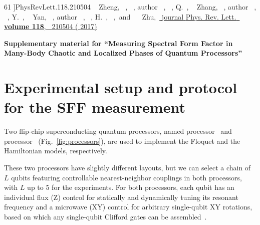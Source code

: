 \documentclass[aps,prx,reprint,twocolumn,superscriptaddress,floatfix,nofootinbib]{revtex4-2}
\newcommand{\beginsupplement}{
    \setcounter{table}{0}
    \renewcommand{\thetable}{S\arabic{table}}
    \setcounter{figure}{0}
    \renewcommand{\thefigure}{S\arabic{figure}}
    \setcounter{equation}{0}
    \renewcommand{\theequation}{S\arabic{equation}}
    \setcounter{section}{0}
    \renewcommand{\thesection}{S\arabic{section}}
    \setcounter{page}{1}
   }
\begin{document}
\begin{thebibliography}{61}
{  }]{PhysRevLett.118.210504}
  \BibitemOpen
   { {~\bibnamefont
  {Zheng}},  {~},
   {\ }, \bibinfo
  {author} {~}, 
  {~},  {\bibfnamefont
  {Q.}~},  {~\bibnamefont
  {Zhang}},  {~}, \bibinfo
  {author} {~}, 
  {~},  {\bibfnamefont
  {Y.}~},  {~\bibnamefont
  {Yan}},  {~}, \bibinfo
  {author} {~}, 
  {\ },  {\bibfnamefont
  {H.}~},  {\
  },\ and\  {~\bibnamefont
  {Zhu}},\ }\href {https://doi.org/10.1103/PhysRevLett.118.210504} {\bibfield
  {journal} {\bibinfo  {journal} {Phys. Rev. Lett.}\ }\textbf {\bibinfo
  {volume} {118}},\ \bibinfo {pages} {210504} (\bibinfo {year}
  {2017})}
\end{thebibliography}

\clearpage

\beginsupplement
\onecolumngrid
\begin{center}
    \textbf{\large Supplementary material for ``Measuring Spectral Form Factor in Many-Body Chaotic and Localized Phases of Quantum Processors''}\\[.2cm]

\end{center}

\section{Experimental setup and protocol for the SFF measurement}

Two flip-chip superconducting quantum processors, named processor~\MakeUppercase{} and processor~\MakeUppercase{} (Fig.~\ref{fig:processors}), are used to implement the Floquet and the Hamiltonian models, respectively.

These two processors have slightly different layouts, but we can select a chain of $L$ qubits featuring controllable nearest-neighbor couplings in both processors, with $L$ up to 5 for the experiments.
For both processors, each qubit has an individual flux (Z) control for statically and dynamically tuning its resonant frequency and a microwave (XY) control for arbitrary single-qubit XY rotations, based on which any single-qubit Clifford gates can be assembled~\cite{PhysRevA.90.030303}.
\end{document}
